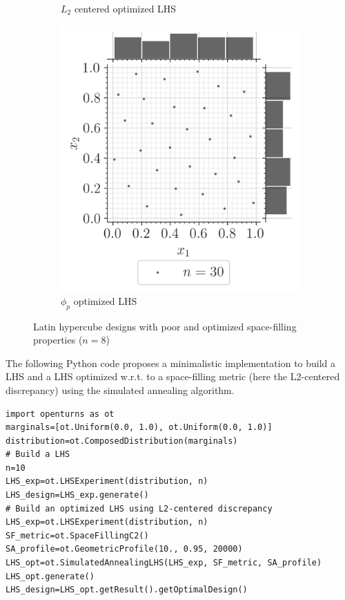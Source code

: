 \begin{figure}[ht]
\begin{subfigure}[b]{0.32\textwidth}
        \caption{$L_2$ centered optimized LHS}
    \end{subfigure}
    \hfill
    \begin{subfigure}[b]{0.32\textwidth}
        \centering
        \includegraphics[width=\textwidth]{../numerical_experiments/chapter1/figures/optimized_phip_LHS.png}
        \caption{$\phi_p$ optimized LHS}
    \end{subfigure}
       \caption{Latin hypercube designs with poor and optimized space-filling properties ($n=8$)}
       \label{fig:LHS_designs}
\end{figure}


\begin{otexample}
    The following Python code proposes a minimalistic \ot implementation to build a LHS and 
    a LHS optimized w.r.t. to a space-filling metric (here the L2-centered discrepancy) using the simulated annealing algorithm. 
    \lstset{style=mystyle, language=python}
\begin{lstlisting}
import openturns as ot
marginals=[ot.Uniform(0.0, 1.0), ot.Uniform(0.0, 1.0)]
distribution=ot.ComposedDistribution(marginals)
# Build a LHS
n=10
LHS_exp=ot.LHSExperiment(distribution, n)
LHS_design=LHS_exp.generate()
# Build an optimized LHS using L2-centered discrepancy
LHS_exp=ot.LHSExperiment(distribution, n)
SF_metric=ot.SpaceFillingC2()
SA_profile=ot.GeometricProfile(10., 0.95, 20000)
LHS_opt=ot.SimulatedAnnealingLHS(LHS_exp, SF_metric, SA_profile)
LHS_opt.generate()
LHS_design=LHS_opt.getResult().getOptimalDesign()
\end{lstlisting}
\end{otexample}


